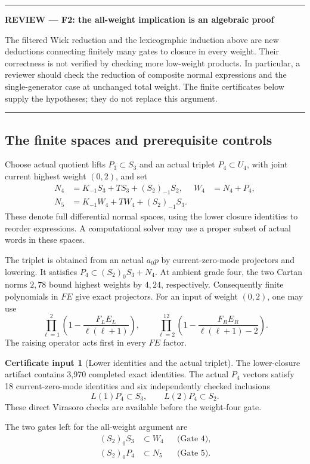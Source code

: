 \documentclass[11pt,a4paper]{article}
\theoremstyle{definition}
\newtheorem{certificate}[theorem]{Certificate input}
\newenvironment{reviewnote}[1]{\par\addvspace{8pt}\begingroup
  \color{Sepia}\noindent\rule{\linewidth}{0.7pt}\par\nobreak
  \noindent\textbf{REVIEW --- #1}\par\nobreak\small\noindent\ignorespaces
}{\par\noindent\rule{\linewidth}{0.7pt}\par\endgroup\addvspace{8pt}}
\begin{document}
\begin{reviewnote}{F2: the all-weight implication is an algebraic proof}
The filtered Wick reduction and the lexicographic induction above are
new deductions connecting finitely many gates to closure in every weight.
Their correctness is not verified by checking more low-weight products.
In particular, a reviewer should check the reduction of composite normal
expressions and the single-generator case at unchanged total weight.
The finite certificates below supply the hypotheses; they do not replace
this argument.
\end{reviewnote}

\subsection{The finite spaces and prerequisite controls}
Choose actual quotient lifts \(P_3\subset S_3\) and an actual triplet
\(P_4\subset U_4\), with joint current highest weight \((0,2)\), and set
\begin{align}
 N_4&=K_{-1}S_3+TS_3+(S_2)_{-1}S_2,&W_4&=N_4+P_4,\label{eq:normal4}\\
 N_5&=K_{-1}W_4+TW_4+(S_2)_{-1}S_3.&&\label{eq:normal5}
\end{align}
These denote full differential normal spaces, using the lower closure
identities to reorder expressions. A computational solver may use a
proper subset of actual words in these spaces.

The triplet is obtained from an actual \(a_0p\) by current-zero-mode
projectors and lowering. It satisfies
\(P_4\subset (S_2)_0S_3+N_4\). At ambient grade four, the two
Cartan norms \(2,78\) bound highest weights by \(4,24\), respectively.
Consequently finite polynomials in \(FE\) give exact projectors.
For an input of weight \((0,2)\), one may use
\[
 \prod_{\ell=1}^{2}\left(1-\frac{F_LE_L}{\ell(\ell+1)}\right),
 \qquad
 \prod_{\ell=2}^{12}\left(1-\frac{F_RE_R}{\ell(\ell+1)-2}\right).
\]
The raising operator acts first in every \(FE\) factor.

\begin{certificate}[Lower identities and the actual triplet]\label{cert:lower}
The lower-closure artifact contains 3,970 completed exact identities.
The actual \(P_4\) vectors satisfy 18 current-zero-mode identities and
six independently checked inclusions
\[
 L(1)P_4\subset S_3,\qquad L(2)P_4\subset S_2.
\]
These direct Virasoro checks are available before the weight-four gate.
\end{certificate}
The two gates left for the all-weight argument are
\begin{align}
 (S_2)_0S_3&\subset W_4 &&\text{(Gate 4)},\label{eq:gate4}\\
 (S_2)_0P_4&\subset N_5 &&\text{(Gate 5)}.\label{eq:gate5}
\end{align}
\end{document}
